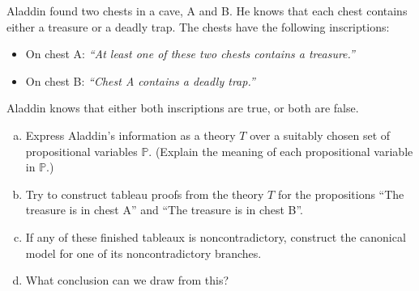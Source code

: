 \begin{problem}
    
    Aladdin found two chests in a cave, A and B. He knows that each chest contains either a treasure or a deadly trap. The chests have the following inscriptions:
    \begin{itemize}
    \item On chest A: {\it ``At least one of these two chests contains a treasure.''}
    \item On chest B: {\it ``Chest A contains a deadly trap.''}
    \end{itemize}
    Aladdin knows that either both inscriptions are true, or both are false.
    \begin{enumerate}[(a)]
        \item Express Aladdin's information as a theory $T$ over a suitably chosen set of propositional variables $\mathbb P$. (Explain the meaning of each propositional variable in $\mathbb P$.)
        \item Try to construct tableau proofs from the theory $T$ for the propositions ``The treasure is in chest A'' and ``The treasure is in chest B''.
        \item If any of these finished tableaux is noncontradictory, construct the canonical model for one of its noncontradictory branches.
        \item What conclusion can we draw from this?
    \end{enumerate}


\end{problem}
